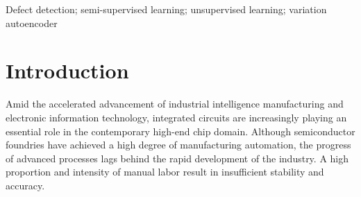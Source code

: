 \documentclass[conference]{IEEEtran}
\begin{document}
\begin{abstract}

As the globalization of semiconductor design and manufacturing processes continues, the demand for defect detection during integrated circuit fabrication stages is becoming increasingly critical, playing a significant role in enhancing the yield of semiconductor products. Traditional wafer map defect pattern detection methods involve manual inspection using electron microscopes to collect sample images, which are then assessed by experts for defects. This approach is labor-intensive and inefficient. Consequently, there is a pressing need to develop a model capable of automatically detecting defects as an alternative to manual operations.
In this paper, we propose a method that initially employs a pre-trained VAE model to obtain the fault distribution information of the wafer map. This information serves as guidance, combined with the original image set for semi-supervised model training. During the semi-supervised training, we utilize a teacher-student network for iterative learning. The model presented in this paper is validated on the benchmark dataset WM-811K wafer dataset. The experimental results demonstrate superior classification accuracy and detection performance compared to state-of-the-art models, fulfilling the requirements for industrial applications. Compared to the original architecture, we have achieved significant performance improvement.

\end{abstract}

\begin{IEEEkeywords}
Defect detection; semi-supervised learning; unsupervised learning; variation autoencoder
\end{IEEEkeywords}


\section{Introduction}


Amid the accelerated advancement of industrial intelligence manufacturing and electronic information technology, integrated circuits are increasingly playing an essential role in the contemporary high-end chip domain. Although semiconductor foundries have achieved a high degree of manufacturing automation, the progress of advanced processes lags behind the rapid development of the industry. A high proportion and intensity of manual labor result in insufficient stability and accuracy.
\end{document}
